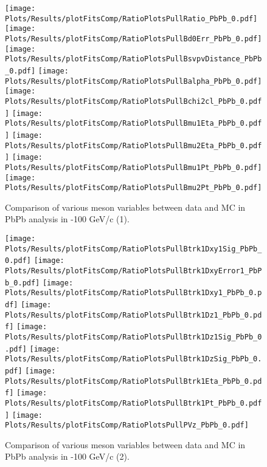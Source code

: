 \begin{figure}[h]
\begin{center}
\texttt{[image: Plots/Results/plotFitsComp/RatioPlotsPullRatio\_PbPb\_0.pdf]}
\texttt{[image: Plots/Results/plotFitsComp/RatioPlotsPullBd0Err\_PbPb\_0.pdf]}
\texttt{[image: Plots/Results/plotFitsComp/RatioPlotsPullBsvpvDistance\_PbPb\_0.pdf]}
\texttt{[image: Plots/Results/plotFitsComp/RatioPlotsPullBalpha\_PbPb\_0.pdf]}
\texttt{[image: Plots/Results/plotFitsComp/RatioPlotsPullBchi2cl\_PbPb\_0.pdf]}
\texttt{[image: Plots/Results/plotFitsComp/RatioPlotsPullBmu1Eta\_PbPb\_0.pdf]}
\texttt{[image: Plots/Results/plotFitsComp/RatioPlotsPullBmu2Eta\_PbPb\_0.pdf]}
\texttt{[image: Plots/Results/plotFitsComp/RatioPlotsPullBmu1Pt\_PbPb\_0.pdf]}
\texttt{[image: Plots/Results/plotFitsComp/RatioPlotsPullBmu2Pt\_PbPb\_0.pdf]}
\caption{
Comparison of various \Bplus meson variables between data and MC in PbPb analysis in -100 GeV/c (1).}
\label{fig:DataMCComparisonPbPb1}
\end{center}
\end{figure}

\begin{figure}[h]
\begin{center}
\texttt{[image: Plots/Results/plotFitsComp/RatioPlotsPullBtrk1Dxy1Sig\_PbPb\_0.pdf]}
\texttt{[image: Plots/Results/plotFitsComp/RatioPlotsPullBtrk1DxyError1\_PbPb\_0.pdf]}
\texttt{[image: Plots/Results/plotFitsComp/RatioPlotsPullBtrk1Dxy1\_PbPb\_0.pdf]}
\texttt{[image: Plots/Results/plotFitsComp/RatioPlotsPullBtrk1Dz1\_PbPb\_0.pdf]}
\texttt{[image: Plots/Results/plotFitsComp/RatioPlotsPullBtrk1Dz1Sig\_PbPb\_0.pdf]}
\texttt{[image: Plots/Results/plotFitsComp/RatioPlotsPullBtrk1DzSig\_PbPb\_0.pdf]}
\texttt{[image: Plots/Results/plotFitsComp/RatioPlotsPullBtrk1Eta\_PbPb\_0.pdf]}
\texttt{[image: Plots/Results/plotFitsComp/RatioPlotsPullBtrk1Pt\_PbPb\_0.pdf]}
\texttt{[image: Plots/Results/plotFitsComp/RatioPlotsPullPVz\_PbPb\_0.pdf]}
\caption{
Comparison of various \Bplus meson variables between data and MC in PbPb analysis in -100 GeV/c (2).}
\label{fig:DataMCComparisonPbPb2}
\end{center}
\end{figure}

